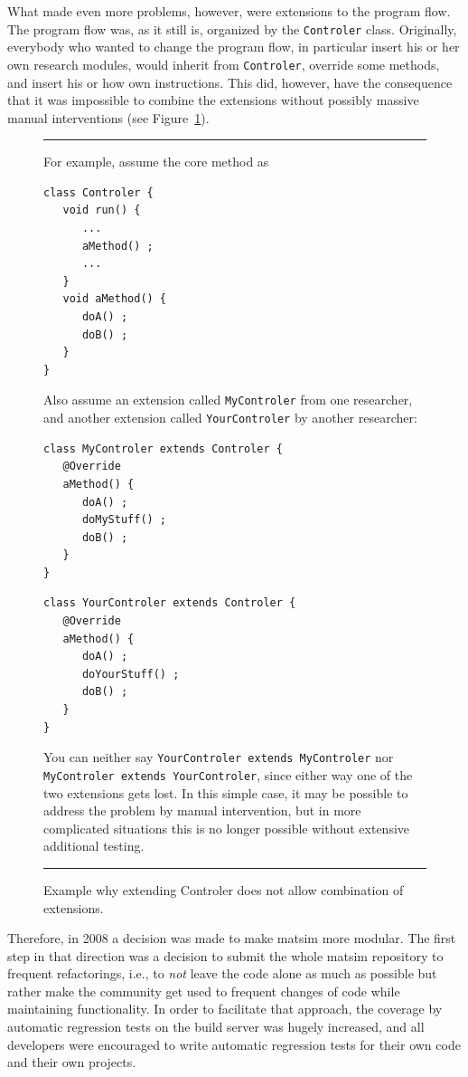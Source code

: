 What made even more problems, however, were extensions to the program flow.  The program flow was, as it still is, organized by the \lstinline$Controler$ class.  Originally, everybody who wanted to change the program flow, in particular insert his or her own research \glspl{module}, would inherit from \lstinline$Controler$, override some methods, and insert his or how own instructions.  This did, however, have the consequence that it was impossible to combine the \glspl{extension} without possibly massive manual interventions (see Figure~\ref{fig:do-not-extend-controler}).

\begin{figure}\footnotesize
\hrule
\strut For example, assume the core method as
\begin{lstlisting}
class Controler {
   void run() {
      ...
      aMethod() ;
      ...
   }
   void aMethod() {
      doA() ;
      doB() ;
   }
}
\end{lstlisting}
Also assume an extension called \protect\lstinline$MyControler$
from one researcher, and another extension called \protect\lstinline$YourControler$ by another researcher:
\begin{lstlisting}
class MyControler extends Controler {
   @Override
   aMethod() {
      doA() ;
      doMyStuff() ;
      doB() ;
   }
}
\end{lstlisting}
\begin{lstlisting}
class YourControler extends Controler {
   @Override
   aMethod() {
      doA() ;
      doYourStuff() ;
      doB() ;
   }
}  
\end{lstlisting}
You can neither say \protect\lstinline$YourControler extends MyControler$ nor \protect\lstinline$MyControler extends YourControler$, since either way one of the two extensions gets lost.  In this simple case, it may be possible to address the problem by manual intervention, but in more complicated situations this is no longer possible without extensive additional testing. \strut
\hrule
\caption{Example why extending Controler does not allow combination of extensions.}
\label{fig:do-not-extend-controler}
\end{figure}

Therefore, in 2008 a decision was made to make \gls{matsim} more modular.  The first step in that direction was a decision to submit the whole \gls{matsim} repository to frequent refactorings, i.e., to \emph{not} leave the code alone as much as possible but rather make the community get used to frequent changes of code while maintaining functionality.  In order to facilitate that approach, the coverage by automatic regression tests on the build server was hugely increased, and all developers were encouraged to write automatic regression tests for their own code and their own projects. 

